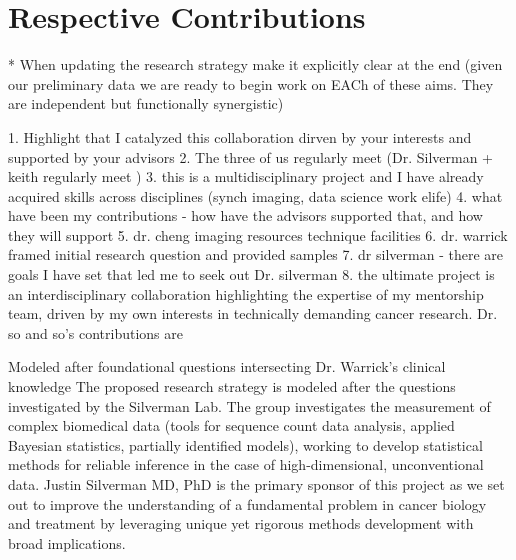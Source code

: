 \documentclass{NIHGrant}
\begin{document}
\part*{Respective Contributions}
\begin{itemize}
        * When updating the research strategy make it explicitly clear at the end (given our preliminary data we are ready to begin work on EACh of these aims. They are independent but functionally synergistic)

1. Highlight that I catalyzed this collaboration dirven by your interests and supported by your advisors
2. The three of us regularly meet (Dr. Silverman + keith regularly meet )
3. this is a multidisciplinary project and I have already acquired skills across disciplines (synch imaging, data science work elife)
         4. what have been my contributions - how have the advisors supported that, and how they will support
         5. dr. cheng imaging resources technique facilities
         6. dr. warrick framed initial research question and provided samples
         7. dr silverman - there are goals I have set that led me to seek out Dr. silverman
         8. the ultimate project is an interdisciplinary collaboration highlighting the expertise of my mentorship team, driven by my own interests in technically demanding cancer research. Dr. so and so's contributions are

 \end{itemize}

Modeled after foundational questions intersecting Dr. Warrick's clinical knowledge
The proposed research strategy is modeled after the questions investigated by the Silverman Lab. The group investigates the measurement of complex biomedical data (tools for sequence count data analysis, applied Bayesian statistics, partially identified models), working to develop statistical methods for reliable inference in the case of high-dimensional, unconventional data. Justin Silverman MD, PhD is the primary sponsor of this project as we set out to improve the understanding of a fundamental problem in cancer biology and treatment by leveraging unique yet rigorous methods development with broad implications.
\end{document}
